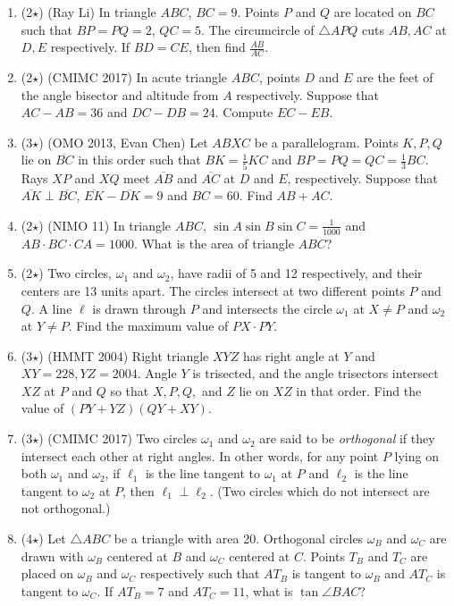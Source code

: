 \documentclass[11pt]{scrartcl}
\begin{document}
\begin{enumerate}
    \item (2$\star$) (Ray Li) In triangle $ABC$, $BC=9$. Points $P$ and $Q$ are located on $BC$ such that $BP=PQ=2$, $QC=5$. The circumcircle of $\triangle APQ$ cuts $AB, AC$ at $D, E$ respectively. If $BD=CE$, then find $\frac{AB}{AC}$.

    \item (2$\star$) (CMIMC 2017) In acute triangle $ABC$, points $D$ and $E$ are the feet of the angle bisector and altitude from $A$ respectively. Suppose that $AC-AB=36$ and $DC-DB=24$. Compute $EC-EB$.

    \item (3$\star$) (OMO 2013, Evan Chen) Let $ABXC$ be a parallelogram. Points $K,P,Q$ lie on $\overline{BC}$ in this order such that $BK = \frac{1}{5}KC$ and $BP=PQ=QC = \frac{1}{3}BC$. Rays $XP$ and $XQ$ meet $\overline{AB}$ and $\overline{AC}$ at $D$ and $E$, respectively. Suppose that $\overline{AK} \perp \overline{BC}$, $\overline{EK}-\overline{DK}=9$ and $BC=60$. Find $AB+AC$.

    \item (2$\star$) (NIMO 11) In triangle $ABC$, $\sin A \sin B \sin C = \frac{1}{1000}$ and $AB \cdot BC \cdot CA = 1000$. What is the area of triangle $ABC$? 

    \item (2$\star$) Two circles, $\omega_1$ and $\omega_2$, have radii of 5 and 12 respectively, and their centers are 13 units apart. The circles intersect at two different points $P$ and $Q$. A line $\ell$ is drawn through $P$ and intersects the circle $\omega_1$ at $X \neq P$ and $\omega_2$ at $Y \neq P$. Find the maximum value of $PX \cdot PY$.

    \item (3$\star$) (HMMT 2004) Right triangle $XYZ$ has right angle at $Y$ and $XY=228, YZ=2004$. Angle $Y$ is trisected, and the angle trisectors intersect $XZ$ at $P$ and $Q$ so that $X, P, Q,$ and $Z$ lie on $XZ$ in that order. Find the value of $(PY+YZ)(QY+XY)$.

    \item (3$\star$) (CMIMC 2017) Two circles $\omega_1$ and $\omega_2$ are said to be \textit{orthogonal} if they intersect each other at right angles. In other words, for any point $P$ lying on both $\omega_1$ and $\omega_2$, if $\ell_1$ is the line tangent to $\omega_1$ at $P$ and $\ell_2$ is the line tangent to $\omega_2$ at $P$, then $\ell_1 \perp \ell_2$. (Two circles which do not intersect are not orthogonal.)
    
    \item (4$\star$) Let $\triangle ABC$ be a triangle with area 20. Orthogonal circles $\omega_B$ and $\omega_C$ are drawn with $\omega_B$ centered at $B$ and $\omega_C$ centered at $C$. Points $T_B$ and $T_C$ are placed on $\omega_B$ and $\omega_C$ respectively such that $AT_B$ is tangent to $\omega_B$ and $AT_C$ is tangent to $\omega_C$. If $AT_B=7$ and $AT_C=11$, what is $\tan \angle BAC$?

\end{enumerate}
\end{document}
